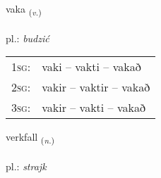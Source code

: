 \documentclass[frontgrid, backgrid]{flacards}\usepackage[]{graphicx}\usepackage[]{xcolor}
\begin{document}
\renewcommand{\flhead}{\vskip5pt \fboxsep=0pt {\small\bfseries\footnotesize Sagnorð | czasownik}}
\renewcommand{\fcfoot}{\vskip5pt \fboxsep=0pt \hspace{2pt}{\small\bfseries\footnotesize 3K}}

\renewcommand{\blhead}{\vskip5pt {\small\bfseries\footnotesize Sagnorð | czasownik }}
\renewcommand{\bcfoot}{\vskip5pt \hspace{2pt}{\small\bfseries\footnotesize 3K}}


{vaka \small{\textsubscript{(\textit{v.})}} \\[1ex] %
\textphonetic{[vaːka]} \\
pl.: \emph{budzić} \\  [2ex]
\renewcommand*{\arraystretch}{0.8}
\begin{tabular}{p{1cm}l}
\textsc{1sg}: & vaki -- vakti -- vakað \\ 
\textsc{2sg}: & vakir -- vaktir -- vakað \\ 
\textsc{3sg}: & vakir -- vakti -- vakað \\ 
\end{tabular}
}

\renewcommand{\flhead}{\vskip5pt \fboxsep=0pt {\small\bfseries\footnotesize Nafnorð | rzeczownik}}
\renewcommand{\fcfoot}{\vskip5pt \fboxsep=0pt \hspace{2pt}{\small\bfseries\footnotesize 3K}}

\renewcommand{\blhead}{\vskip5pt {\small\bfseries\footnotesize Nafnorð | rzeczownik }}
\renewcommand{\bcfoot}{\vskip5pt \hspace{2pt}{\small\bfseries\footnotesize 3K}}


{verkfall \small{\textsubscript{(\textit{n.})}} \\[1ex] %
 \\
pl.: \emph{strajk} \\  [2ex]
\renewcommand*{\arraystretch}{0.8}
}
\end{document}
